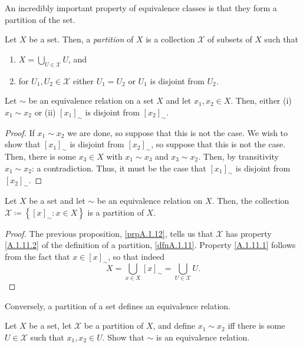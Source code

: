 An incredibly important property of equivalence classes is that they form a partition of the set.
\begin{dfn}[Partition]\label{dfnA.1.11}
Let $X$ be a set.  Then, a \emph{partition} of $X$ is a collection $\mathcal{X}$ of subsets of $X$ such that
\begin{enumerate}
\item \label{A.1.11.1}$X=\bigcup _{U\in \mathcal{X}}U$, and
\item \label{A.1.11.2}for $U_1,U_2\in \mathcal{X}$ either $U_1=U_2$ or $U_1$ is disjoint from $U_2$.
\end{enumerate}
\end{dfn}
\begin{prp}\label{prpA.1.12}
Let $\sim$ be an equivalence relation on a set $X$ and let $x_1,x_2\in X$.  Then, either (i) $x_1\sim x_2$ or (ii) $[x_1]_\sim$ is disjoint from $[x_2]_\sim$.
\begin{proof}
If $x_1\sim x_2$ we are done, so suppose that this is not the case.  We wish to show that $[x_1]_\sim$ is disjoint from $[x_2]_\sim$, so suppose that this is not the case.  Then, there is some $x_3\in X$ with $x_1\sim x_3$ and $x_3\sim x_2$.  Then, by transitivity $x_1\sim x_2$:  a contradiction.  Thus, it must be the case that $[x_1]_\sim$ is disjoint from $[x_2]_\sim$.
\end{proof}
\end{prp}
\begin{crl}\label{crlA.1.13}
Let $X$ be a set and let $\sim$ be an equivalence relation on $X$.  Then, the collection $\mathcal{X}\coloneqq \left\{ [x]_\sim :x\in X\right\}$ is a partition of $X$.
\begin{proof}
The previous proposition, \cref{prpA.1.12}, tells us that $\mathcal{X}$ has property \cref{A.1.11.2} of the definition of a partition, \cref{dfnA.1.11}.  Property \cref{A.1.11.1} follows from the fact that $x\in [x]_\sim$, so that indeed
\begin{equation}
X=\bigcup _{x\in X}[x]_\sim =\bigcup _{U\in \mathcal{X}}U.
\end{equation}
\end{proof}
\end{crl}
Conversely, a partition of a set defines an equivalence relation.
\begin{exr}\label{exrA.1.41}
Let $X$ be a set, let $\mathcal{X}$ be a partition of $X$, and define $x_1\sim x_2$ iff there is some $U\in \mathcal{X}$ such that $x_1,x_2\in U$.  Show that $\sim$ is an equivalence relation.
\end{exr}
